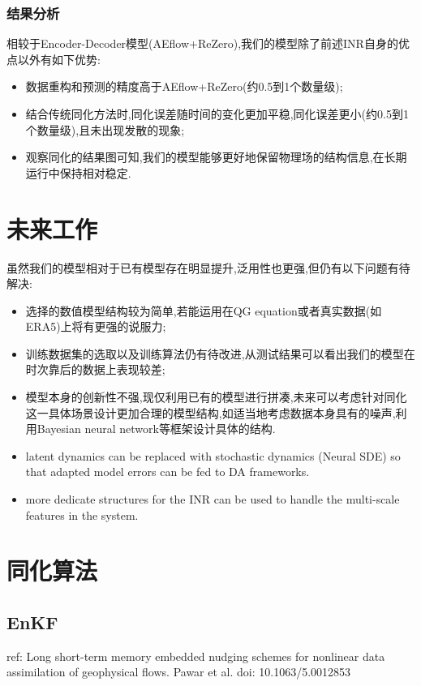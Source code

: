 \documentclass{article}
\begin{document}
\subsubsection{结果分析}
相较于Encoder-Decoder模型(AEflow+ReZero),我们的模型除了前述INR自身的优点以外有如下优势:
\begin{itemize}
	\item 数据重构和预测的精度高于AEflow+ReZero(约0.5到1个数量级);
	\item 结合传统同化方法时,同化误差随时间的变化更加平稳,同化误差更小(约0.5到1个数量级),且未出现发散的现象;
	\item 观察同化的结果图可知,我们的模型能够更好地保留物理场的结构信息,在长期运行中保持相对稳定.
\end{itemize}
\section{未来工作}
虽然我们的模型相对于已有模型存在明显提升,泛用性也更强,但仍有以下问题有待解决:
\begin{itemize}
	\item 选择的数值模型结构较为简单,若能运用在QG equation或者真实数据(如ERA5)上将有更强的说服力;
	\item 训练数据集的选取以及训练算法仍有待改进,从测试结果可以看出我们的模型在时次靠后的数据上表现较差;
	\item 模型本身的创新性不强,现仅利用已有的模型进行拼凑,未来可以考虑针对同化这一具体场景设计更加合理的模型结构,如适当地考虑数据本身具有的噪声,利用Bayesian neural network\cite{Goan2020BNNsurvey}等框架设计具体的结构.
	\item latent dynamics can be replaced with stochastic dynamics (Neural SDE) so that adapted model errors can be fed to DA frameworks.
	\item more dedicate structures for the INR can be used to handle the multi-scale features in the system.
\end{itemize}
\appendix
\section{同化算法}
\subsection{EnKF}
ref:
Long short-term memory embedded
nudging schemes for nonlinear data
assimilation of geophysical flows. Pawar et al. doi: 10.1063/5.0012853
\end{document}
